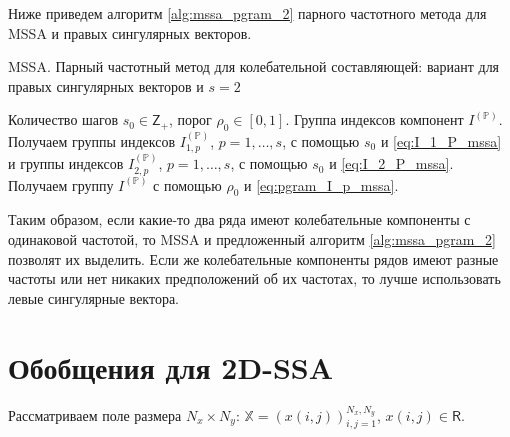 \documentclass[specialist,
               substylefile = spbu.rtx,
               subf,href,colorlinks=true, 12pt]{disser}
\begin{document}
{{Ниже приведем алгоритм \ref{alg:mssa_pgram_2} парного частотного метода для MSSA и правых сингулярных векторов.

\begin{algorithm}[!hhh]
\caption{MSSA. Парный частотный метод для колебательной составляющей: вариант для правых сингулярных векторов и $s=2$}
\label{alg:mssa_pgram_2}
\begin{algorithmic}[1]
\REQUIRE Количество шагов $s_0 \in \mathsf{Z}_{+}$, порог $\rho_0 \in [0,1]$.
\ENSURE Группа индексов компонент $I^{(\mathbb{P})}$.
\STATE  Получаем группы индексов $I_{1,p}^{(\mathbb{P})}$, $p=1,\ldots,s$, с помощью $s_0$ и \eqref{eq:I_1_P_mssa} и группы индексов $I_{2,p}^{(\mathbb{P})}$, $p=1,\ldots,s$, с помощью $s_0$ и \eqref{eq:I_2_P_mssa}. 
\STATE Получаем группу $I^{(\mathbb{P})}$ с помощью $\rho_0$ и \eqref{eq:pgram_I_p_mssa}.
\end{algorithmic}
\end{algorithm}

Таким образом, если какие-то два ряда имеют колебательные компоненты с одинаковой частотой, то MSSA и предложенный алгоритм \ref{alg:mssa_pgram_2} позволят их выделить. Если же колебательные компоненты рядов имеют разные частоты или нет никаких предположений об их частотах, то лучше использовать левые сингулярные вектора.  

%

\section{Обобщения для 2D-SSA}

Рассматриваем поле размера $N_x \times N_y$: $\mathbb{X}= \left(x(i,j) \right)_{i,j=1}^{N_x,N_y}$, $x(i,j) \in \mathsf{R}$.

}}
\end{document}
